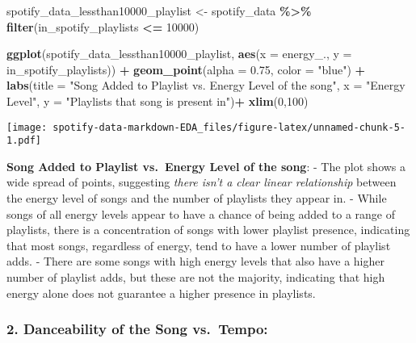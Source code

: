 \documentclass[
]{article}
\newenvironment{Shaded}{\begin{snugshade}}{\end{snugshade}}
\newcommand{\AttributeTok}[1]{\textcolor[rgb]{0.13,0.29,0.53}{#1}}
\newcommand{\DecValTok}[1]{\textcolor[rgb]{0.00,0.00,0.81}{#1}}
\newcommand{\FloatTok}[1]{\textcolor[rgb]{0.00,0.00,0.81}{#1}}
\newcommand{\FunctionTok}[1]{\textcolor[rgb]{0.13,0.29,0.53}{\textbf{#1}}}
\newcommand{\NormalTok}[1]{#1}
\newcommand{\OtherTok}[1]{\textcolor[rgb]{0.56,0.35,0.01}{#1}}
\newcommand{\SpecialCharTok}[1]{\textcolor[rgb]{0.81,0.36,0.00}{\textbf{#1}}}
\newcommand{\StringTok}[1]{\textcolor[rgb]{0.31,0.60,0.02}{#1}}
\begin{document}
\begin{Shaded}
\begin{Highlighting}[]
\NormalTok{spotify\_data\_lessthan10000\_playlist }\OtherTok{\textless{}{-}}\NormalTok{ spotify\_data }\SpecialCharTok{\%\textgreater{}\%} 
  \FunctionTok{filter}\NormalTok{(in\_spotify\_playlists }\SpecialCharTok{\textless{}=} \DecValTok{10000}\NormalTok{)}

\FunctionTok{ggplot}\NormalTok{(spotify\_data\_lessthan10000\_playlist, }\FunctionTok{aes}\NormalTok{(}\AttributeTok{x =}\NormalTok{ energy\_., }\AttributeTok{y =}\NormalTok{ in\_spotify\_playlists)) }\SpecialCharTok{+}
  \FunctionTok{geom\_point}\NormalTok{(}\AttributeTok{alpha =} \FloatTok{0.75}\NormalTok{, }\AttributeTok{color =} \StringTok{"blue"}\NormalTok{) }\SpecialCharTok{+}
  \FunctionTok{labs}\NormalTok{(}\AttributeTok{title =} \StringTok{"Song Added to Playlist  vs. Energy Level of the song"}\NormalTok{,}
       \AttributeTok{x =} \StringTok{"Energy Level"}\NormalTok{,}
       \AttributeTok{y =} \StringTok{"Playlists that song is present in"}\NormalTok{)}\SpecialCharTok{+}
  \FunctionTok{xlim}\NormalTok{(}\DecValTok{0}\NormalTok{,}\DecValTok{100}\NormalTok{)}
\end{Highlighting}
\end{Shaded}

\texttt{[image: spotify-data-markdown-EDA\_files/figure-latex/unnamed-chunk-5-1.pdf]}

\textbf{Song Added to Playlist vs.~Energy Level of the song}: - The plot
shows a wide spread of points, suggesting \emph{there isn't a clear
linear relationship} between the energy level of songs and the number of
playlists they appear in. - While songs of all energy levels appear to
have a chance of being added to a range of playlists, there is a
concentration of songs with lower playlist presence, indicating that
most songs, regardless of energy, tend to have a lower number of
playlist adds. - There are some songs with high energy levels that also
have a higher number of playlist adds, but these are not the majority,
indicating that high energy alone does not guarantee a higher presence
in playlists.

\hypertarget{danceability-of-the-song-vs.-tempo}{%
\subsubsection{2. Danceability of the Song
vs.~Tempo:}\label{danceability-of-the-song-vs.-tempo}}
\end{document}
